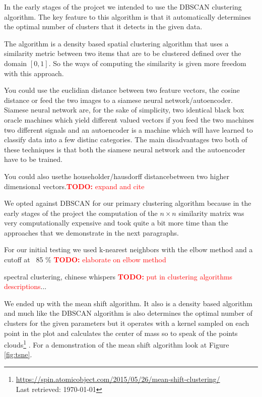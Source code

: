 \documentclass[journal]{vgtc}       %
\newcommand{\todo}[1]{\textcolor{red}{\textbf{TODO:} #1}}
\begin{document}
In the early stages of the projcet we intended to use the DBSCAN clustering algorithm. 
The key feature to this algorithm is that it automatically determines the optimal number of clusters that it detects in the given data. 

The algorithm is a density based spatial clustering algorithm that uses a similarity metric between two items that are to be  clustered defined over the domain \([0,1]\). So the ways of computing the similarity is given more freedom with this approach.

You could use the euclidian distance between two feature vectors, the cosine distance or feed the two images to a siamese neural network/autoencoder. Siamese neural network are, for the sake of simplicity, two identical black box oracle machines which yield different valued vectors if you feed the two machines two different signals and  an autoencoder is a machine which will have learned to classify data into a few distinc categories. The main disadvantages two both of these techniques is that both the siamese neural network and the autoencoder have to be trained.

You could also usethe householder/hausdorff distancebetween two higher dimensional vectors.\todo{expand and cite}

We opted against DBSCAN for our primary clustering algorithm because in the early stages of the project the computation of the \(n\times n\) similarity matrix was very computationally expensive and took quite a bit more time than the approaches that we demonstrate in the next paragraphs.


For our initial testing we used k-nearest neighbors with the elbow method and a cutoff at  ~85 \% \todo{elaborate on elbow method}

spectral clustering, chinese whispers  \todo{put in clustering algorithms descriptions}... 

We ended up with the mean shift algorithm. It also is a density based algorithm and much like the DBSCAN algorithm is also determines the optimal number of clusters for the given parameters but it operates with a kernel sampled on each point in the plot and calculates the center of mass so to speak of the points clouds\footnote{\url{https://spin.atomicobject.com/2015/05/26/mean-shift-clustering/}\\ Last retrieved: \today} . For a demonstration of the mean shift algorithm look at Figure \ref{fig:tsne}. 
\end{document}

